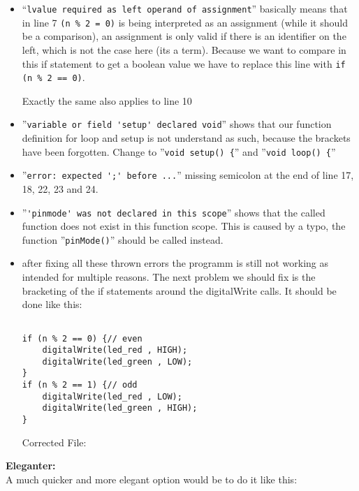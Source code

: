 \documentclass[12pt]{article}
\begin{document}
\begin{itemize}
    \item 
        ``\verb!lvalue required as left operand of assignment!'' basically means that in line 7 \verb!(n % 2 = 0)! is being interpreted as an assignment (while it should be a comparison), an assignment is only valid if there is an identifier on the left, which is not the case here (its a term). Because we want to compare in this if statement to get a boolean value we have to replace this line with \verb!if (n % 2 == 0)!.

        Exactly the same also applies to line 10

    \item
        ''\verb!variable or field 'setup' declared void!'' shows that our function definition for loop and setup is not understand as such, because the brackets have been forgotten. Change to ''\verb!void setup() {!'' and ''\verb!void loop() {!''

        \item
            ''\verb!error: expected ';' before ...!'' missing semicolon at the end of line 17, 18, 22, 23 and 24.

        \item
            ''\verb!'pinmode' was not declared in this scope!'' shows that the called function does not exist in this function scope. This is caused by a typo, the function ''\verb!pinMode()!'' should be called instead.

        \item
            after fixing all these thrown errors the programm is still not working as intended for multiple reasons. The next problem we should fix is the bracketing of the if statements around the digitalWrite calls. It should be done like this:\\

            \newpage
\begin{verbatim}

if (n % 2 == 0) {// even
    digitalWrite(led_red , HIGH);
    digitalWrite(led_green , LOW);
}
if (n % 2 == 1) {// odd
    digitalWrite(led_red , LOW);
    digitalWrite(led_green , HIGH);
}

\end{verbatim}

Corrected File:\\
        


\end{itemize}

\textbf{Eleganter:}\\
A much quicker and more elegant option would be to do it like this:

\end{document}
